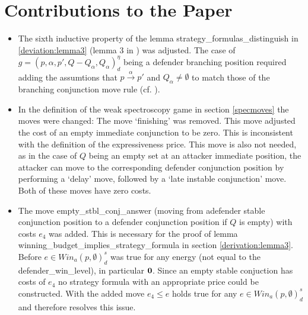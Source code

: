 \section{Contributions to the Paper}
\begin{itemize}
\item The sixth inductive property of the lemma strategy\_formulas\_distinguish in \ref{deviation:lemma3} 
(lemma 3 in \cite{bisping2023lineartimebranchingtime}) was adjusted.
The case of $g=(p,\alpha ,p', Q- Q_\alpha, Q_\alpha)_d^\eta$ being a defender branching position
required adding the assumtions that $p \overset{\alpha}{\longrightarrow} p'$ and $Q_\alpha \neq \emptyset$
to match those of the branching conjunction move rule (cf. \cite[p. 13]{bisping2023lineartimebranchingtime}). 

\item In the definition of the weak spectroscopy game in section \ref{specmoves} the moves were changed: 
The move `finishing' was removed. This move adjusted the cost of an empty immediate conjunction to be zero.
This is inconsistent with the definition of the expressiveness price. This move is also not needed, as in the case of $Q$ being an empty set at an attacker immediate position, the attacker can move to the corresponding
defender conjunction position by performing a `delay' move, followed by a `late instable conjunction' move. Both of these moves have zero costs.

\item The move empty\_stbl\_conj\_answer (moving from adefender stable conjunction position to a defender conjunction
position if $Q$ is empty) with costs $e_4$ was added. This is necessary for the proof of lemma 
winning\_budget\_implies\_strategy\_formula in section \ref{derivation:lemma3}. Before 
$e \in Win_a (p, \emptyset)_d^s $ was true for any energy (not equal to the defender\_win\_level), in particular $\bold{0}$. 
Since an empty stable conjuction has costs of $e_4$ no strategy formula with an appropriate price could be constructed. 
With the added move $e_4 \leq e $ holds true for any $e \in Win_a (p, \emptyset)_d^s $ and therefore resolves this issue.


\end{itemize}
